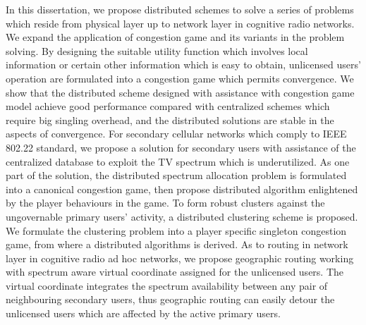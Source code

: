 In this dissertation, we propose distributed schemes to solve a series of problems which reside from physical layer up to network layer in cognitive radio networks.
We expand the application of congestion game and its variants in the problem solving.
By designing the suitable utility function which involves local information or certain other information which is easy to obtain, unlicensed users' operation are formulated into a congestion game which permits convergence.
We show that the distributed scheme designed with assistance with congestion game model achieve good performance compared with centralized schemes which require big singling overhead, and the distributed solutions are stable in the aspects of convergence.
%
For secondary cellular networks which comply to IEEE 802.22 standard, we propose a solution for secondary users with assistance of the centralized database to exploit the TV spectrum which is underutilized.
As one part of the solution, the distributed spectrum allocation problem is formulated into a canonical congestion game, then propose distributed algorithm enlightened by the player behaviours in the game.
%
To form robust clusters against the ungovernable primary users' activity, a distributed clustering scheme is proposed.
We formulate the clustering problem into a player specific singleton congestion game, from where a distributed algorithms is derived.
%
As to routing in network layer in cognitive radio ad hoc networks, we propose geographic routing working with spectrum aware virtual coordinate assigned for the unlicensed users.
The virtual coordinate integrates the spectrum availability between any pair of neighbouring secondary users, thus geographic routing can easily detour the unlicensed users which are affected by the active primary users.
%


